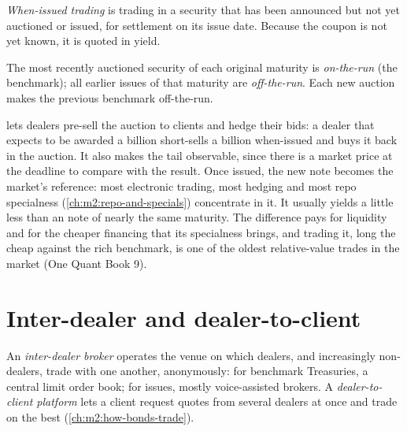 \begin{definition}\label{def:m2:the-treasury-market:wi}
\emph{When-issued trading} is trading in a security
that has been announced but not yet auctioned or issued, for settlement on
its issue date. Because the coupon is not yet known, it is quoted in yield.
\end{definition}

\begin{definition}\label{def:m2:the-treasury-market:otr}
The most recently auctioned security of each original maturity is
\emph{on-the-run} (the benchmark); all earlier issues of that
maturity are \emph{off-the-run}. Each new auction makes the
previous benchmark off-the-run.
\end{definition}

 lets dealers pre-sell the auction to clients and hedge
their bids: a dealer that expects to be awarded a billion short-sells a
billion when-issued and buys it back in the auction. It also makes the tail
observable, since there is a market price at the deadline to compare with the
result. Once issued, the new note becomes the market's reference: most
electronic trading, most hedging and most repo specialness
(\cref{ch:m2:repo-and-specials}) concentrate in it. It usually yields a little
less than an  note of nearly the same maturity. The difference pays
for liquidity and for the cheaper financing that its specialness brings, and
trading it, long the cheap  against the rich benchmark, is one of
the oldest relative-value trades in the market (One Quant Book 9).

\section{Inter-dealer and dealer-to-client}

\begin{definition}\label{def:m2:the-treasury-market:idb}
An \emph{inter-dealer broker} operates the venue on
which dealers, and increasingly non-dealers, trade with one another,
anonymously: for benchmark Treasuries, a central limit order book; for
 issues, mostly voice-assisted brokers. A \emph{dealer-to-client
platform} lets a client request quotes from
several dealers at once and trade on the best (\cref{ch:m2:how-bonds-trade}).
\end{definition}

